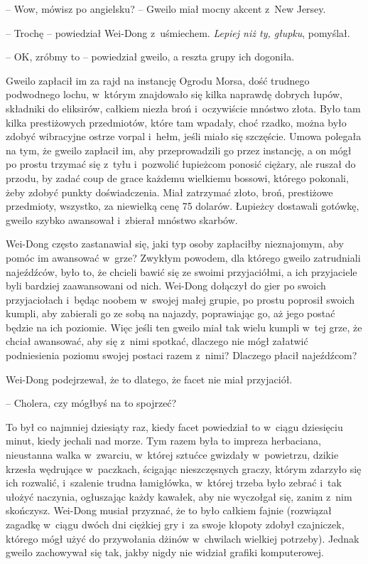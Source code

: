 \documentclass[oneside,polish,11pt,rmheadings]{mwbk}
\begin{document}
-- Wow, mówisz po angielsku? -- Gweilo miał mocny akcent z~New Jersey. 


-- Trochę -- powiedział Wei-Dong z~uśmiechem. \textit{Lepiej niż ty, głupku}, pomyślał. 


-- OK, zróbmy to -- powiedział gweilo, a reszta grupy ich dogoniła. 


Gweilo zapłacił im za rajd na instancję Ogrodu Morsa, dość trudnego podwodnego lochu, w~którym znajdowało się kilka naprawdę dobrych łupów, składniki do eliksirów, całkiem niezła broń i~oczywiście mnóstwo złota. Było tam kilka prestiżowych przedmiotów, które tam wpadały, choć rzadko, można było zdobyć wibracyjne ostrze vorpal i~hełm, jeśli miało się szczęście. Umowa polegała na tym, że gweilo zapłacił im, aby przeprowadzili go przez instancję, a on mógł po prostu trzymać się z~tyłu i~pozwolić łupieżcom ponosić ciężary, ale ruszał do przodu, by zadać coup de grace każdemu wielkiemu bossowi, którego pokonali, żeby zdobyć punkty doświadczenia. Miał zatrzymać złoto, broń, prestiżowe przedmioty, wszystko, za niewielką cenę 75 dolarów. Łupieżcy dostawali gotówkę, gweilo szybko awansował i~zbierał mnóstwo skarbów. 


Wei-Dong często zastanawiał się, jaki typ osoby zapłaciłby nieznajomym, aby pomóc im awansować w~grze? Zwykłym powodem, dla którego gweilo zatrudniali najeźdźców, było to, że chcieli bawić się ze swoimi przyjaciółmi, a ich przyjaciele byli bardziej zaawansowani od nich. Wei-Dong dołączył do gier po swoich przyjaciołach i~będąc noobem w~swojej małej grupie, po prostu poprosił swoich kumpli, aby zabierali go ze sobą na najazdy, poprawiając go, aż jego postać będzie na ich poziomie. Więc jeśli ten gweilo miał tak wielu kumpli w~tej grze, że chciał awansować, aby się z~nimi spotkać, dlaczego nie mógł załatwić podniesienia poziomu swojej postaci razem z~nimi? Dlaczego płacił najeźdźcom? 


Wei-Dong podejrzewał, że to dlatego, że facet nie miał przyjaciół. 


-- Cholera, czy mógłbyś na to spojrzeć? 

To był co najmniej dziesiąty raz, kiedy facet powiedział to w~ciągu dziesięciu minut, kiedy jechali nad morze. Tym razem była to impreza herbaciana, nieustanna walka w~zwarciu, w~której sztućce gwizdały w~powietrzu, dzikie krzesła wędrujące w~paczkach, ścigając nieszczęsnych graczy, którym zdarzyło się ich rozwalić, i~szalenie trudna łamigłówka, w~której trzeba było zebrać i~tak ułożyć naczynia, ogłuszając każdy kawałek, aby nie wyczołgał się, zanim z~nim skończysz. Wei-Dong musiał przyznać, że to było całkiem fajnie (rozwiązał zagadkę w~ciągu dwóch dni ciężkiej gry i~za swoje kłopoty zdobył czajniczek, którego mógł użyć do przywołania dżinów w~chwilach wielkiej potrzeby). Jednak gweilo zachowywał się tak, jakby nigdy nie widział grafiki komputerowej. 
\end{document}

